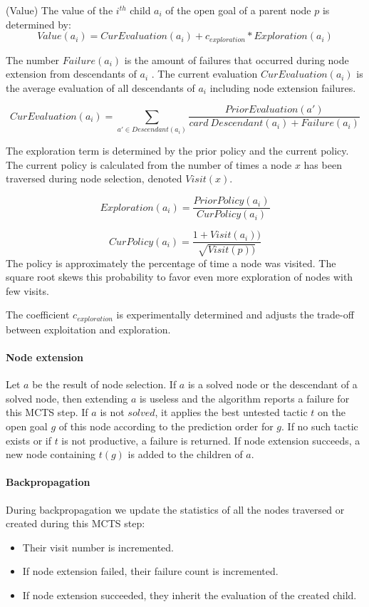 \documentclass[runningheads,a4paper,draft]{svjour3}
\begin{document}
\begin{definition}\label{def:value}(Value)
The value of the $i^{th}$ child $a_i$ of the open goal of a parent node $p$
is determined by:
\[\mathit{Value}(a_i) = \mathit{CurEvaluation}(a_i) + c_{exploration} *
\mathit{Exploration}(a_i)\]

The number $\mathit{Failure}(a_i)$ is the amount of failures that occurred
during node extension from descendants of $a_i$ .
The current evaluation $CurEvaluation(a_i)$ is the average evaluation of
all descendants of $a_i$ including node extension failures.

\[\mathit{CurEvaluation}(a_i) =
  \sum_{a' \in Descendant(a_i)} \frac{\mathit{PriorEvaluation}(a')} {card\
  \mathit{Descendant}(a_i) + \mathit{Failure}(a_i)}\]


The exploration term is determined by the prior policy and the current policy.
The current policy is calculated from the number of times a node $x$ has been
traversed during node selection, denoted $\mathit{Visit}(x)$.

\[\mathit{Exploration}(a_i) =
\frac{\mathit{PriorPolicy}(a_i)}{\mathit{CurPolicy}(a_i)}\]

\[\mathit{CurPolicy}(a_i) = \frac{1 +
\mathit{Visit}(a_i))}{\sqrt{\mathit{Visit}(p))}}\]
The policy is approximately the  percentage of time a node was visited. The
square root skews this probability to favor even more exploration of nodes with
few visits.

The coefficient $c_{exploration}$ is experimentally determined and adjusts the
trade-off between exploitation and exploration.
\end{definition}

\paragraph{Node extension}
Let $a$ be the result of node selection.
If $a$ is a solved node or the descendant of a solved node, then extending $a$
is useless and the algorithm reports a failure for this MCTS step.
If $a$ is not $solved$, it applies the best untested tactic $t$ on the open
goal $g$ of this
node according to the prediction order for $g$. If no such tactic exists or if
$t$ is not productive, a failure is returned.
If node extension succeeds, a new node containing $t(g)$ is added to the
children of $a$.


\paragraph{Backpropagation}
During backpropagation we update the statistics of all the nodes traversed or
created during this MCTS step:
\begin{itemize}
\item Their visit number is incremented.
\item If node extension failed, their failure count is incremented.
\item If node extension succeeded, they inherit the evaluation of the created
child.
\end{itemize}
\end{document}
